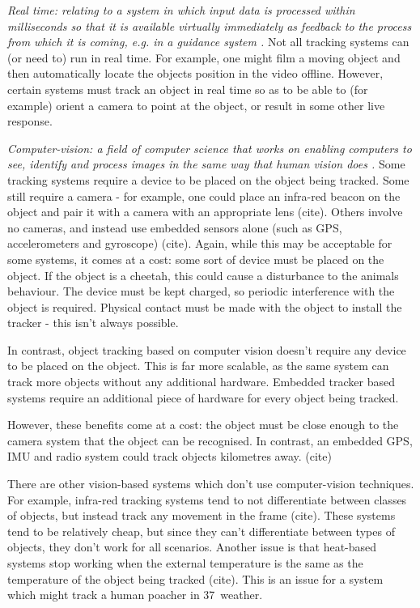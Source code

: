 \textit{Real time: relating to a system in which input data is processed within milliseconds so that it is available virtually immediately as feedback to the process from which it is coming, e.g. in a guidance system \cite{website:definition_real_time}.}
%
Not all tracking systems can (or need to) run in real time. For example, one might film a moving object and then automatically locate the objects position in the video offline. However, certain systems must track an object in real time so as to be able to (for example) orient a camera to point at the object, or result in some other live response.



\textit{Computer-vision: a field of computer science that works on enabling computers to see, identify and process images in the same way that human vision does \cite{website:definition_computer_vision}.}
%
Some tracking systems require a device to be placed on the object being tracked. Some still require a camera - for example, one could place an infra-red beacon on the object and pair it with a camera with an appropriate lens {\color{red} (cite)}. Others involve no cameras, and instead use embedded sensors alone (such as GPS, accelerometers and gyroscope) {\color{red} (cite)}. Again, while this may be acceptable for some systems, it comes at a cost: some sort of device must be placed on the object. If the object is a cheetah, this could cause a disturbance to the animals behaviour. The device must be kept charged, so periodic interference with the object is required. Physical contact must be made with the object to install the tracker - this isn't always possible.

In contrast, object tracking based on computer vision doesn't require any device to be placed on the object. This is far more scalable, as the same system can track more objects without any additional hardware. Embedded tracker based systems require an additional piece of hardware for every object being tracked.

However, these benefits come at a cost: the object must be close enough to the camera system that the object can be recognised. In contrast, an embedded GPS, IMU and radio system could track objects kilometres away. {\color{red} (cite)}

There are other vision-based systems which don't use computer-vision techniques. For example, infra-red tracking systems tend to not differentiate between classes of objects, but instead track any movement in the frame {\color{red} (cite)}. These systems tend to be relatively cheap, but since they can't differentiate between types of objects, they don't work for all scenarios. Another issue is that heat-based systems stop working when the external temperature is the same as the temperature of the object being tracked {\color{red} (cite)}. This is an issue for a system which might track a human poacher in 37\textdegree\ weather.


